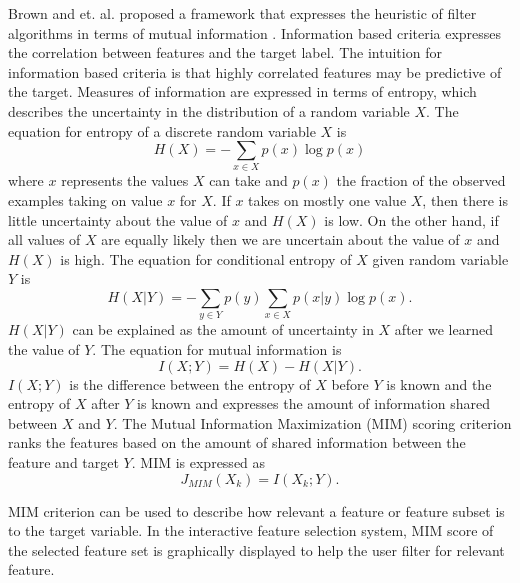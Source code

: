Brown and et. al. proposed a framework that expresses the heuristic of filter algorithms in terms of mutual information \cite{Brown}. Information based criteria expresses the correlation between features and the target label. The intuition for information based criteria is that highly correlated features may be predictive of the target. Measures of information are expressed in terms of entropy, which describes the uncertainty in the distribution of a random variable \(X\). The equation for entropy of a discrete random variable $X$ is
\begin{equation}
H(X) = -\sum_{x \in X} p(x)\log p(x)
\end{equation}
where \(x\) represents the values \(X\) can take and \(p(x)\) the fraction of the observed examples taking on value \(x\) for \(X\). If \(x\) takes on mostly one value \(X\), then there is little uncertainty about the value of \(x\) and \( H(X)\) is low. On the other hand, if all values of \(X\) are equally likely then we are uncertain about the value of \(x\) and \( H(X)\) is high. The equation for conditional entropy of \(X\) given random variable \(Y\) is 
\begin{equation}
H(X|Y) = -\sum_{y \in Y} p(y) \sum_{x \in X} p(x|y)\log p(x).
\end{equation}
\(H(X|Y)\) can be explained as the amount of uncertainty in \(X\) after we learned the value of \(Y\). The equation for mutual information is 
\begin{equation}
I(X;Y)= H(X)-H(X|Y). 
\end{equation}
\(I(X;Y)\) is the difference between the entropy of \(X\) before \(Y\) is known and the entropy of \(X\) after \(Y\) is known and expresses the amount of information shared between \(X\) and \(Y\). The Mutual Information Maximization (MIM) scoring criterion ranks the features based on the amount of shared information between the feature and target $Y$. MIM is expressed as  
\begin{equation}
\label{eqn:MIM}
J_{MIM}(X_k) = I(X_k;Y). 
\end{equation}

MIM criterion can be used to describe how relevant a feature or feature subset is to the target variable. In the interactive feature selection system, MIM score of the selected feature set is graphically displayed to help the user filter for relevant feature.

